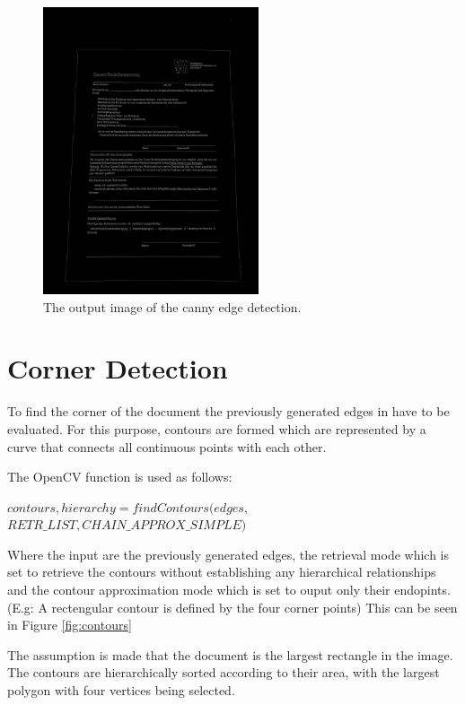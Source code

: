\documentclass[twocolumn,10pt]{asme2ej}
\begin{document}
\begin{figure}[H]
\centerline{\includegraphics[width=2.5in]{output/hoch_3_4_canny.jpg}}
\caption{The output image of the canny edge detection.}
\label{fig:canny}
\end{figure}

\section{Corner Detection}
To find the corner of the document the previously generated edges 
in  have to be evaluated.
For this purpose, contours are formed which are represented by a curve that connects all 
continuous points with each other.\cite{SUZUKI198532}

The OpenCV function\cite{opencv_findcontours} is used as follows:
\begin{center}
    \noindent
    $contours, hierarchy = findContours(edges,$\\
    $RETR\_LIST, CHAIN\_APPROX\_SIMPLE)$
\end{center}

Where the input are the previously generated edges, the retrieval 
mode\cite{opencv_retrievalmode} which is 
set to retrieve the contours without establishing any hierarchical relationships 
and the contour approximation mode\cite{opencv_approxmode} which is set to ouput only their endopints.
(E.g: A rectengular contour is defined by the four corner points)
This can be seen in Figure \ref{fig:contours}

The assumption is made that the document is the largest rectangle in the image.
The contours are hierarchically sorted according to their area, with the largest polygon with four vertices being selected.
\end{document}
